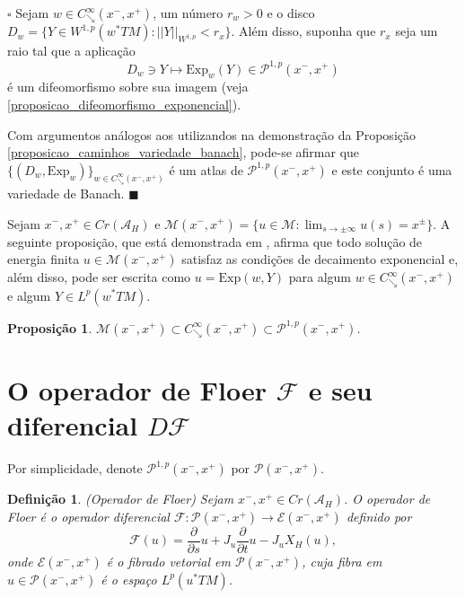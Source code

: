 \documentclass[12pt]{book}
\newtheorem{definicao}[teorema]{Definição}
\newtheorem{proposicao}[teorema]{Proposição}
\newenvironment{prova}[1]{$\square$ #1}{\hfill$\blacksquare$}
\newcommand{\caminhosdecaimentoexponencial}[2]{C^{\infty}_{\searrow}(#1, #2)}
\newcommand{\caminhosdecaimentoexponencialpadrao}{\caminhosdecaimentoexponencial{x^{-}}{x^{+}}}
\newcommand{\caminhosexponenciaisconectantesabrev}{\mathcal{P}(x^{-},x^{+})}
\newcommand{\caminhosexponenciaisconectantes}[2]{\mathcal{P}^{1,p}(#1, #2)}
\newcommand{\caminhosexponenciaisconectantespadrao}{\caminhosexponenciaisconectantes{x^{-}}{x^{+}}}
\newcommand{\diferencialfloer}{D\operadorFloer}
\newcommand{\derivadaparcial}[2]{\frac{\partial #1}{\partial #2}}
\newcommand{\energiafinitaM}{\mathcal{M}}
\newcommand{\energiafinitaMconectante}{\energiafinitaM(x^{-}, x^{+})}
\newcommand{\espacoLp}[1]{L^{p}(#1)}
\newcommand{\espacosobolev}[1]{W^{1,p}(#1)}
\newcommand{\Exp}{\text{Exp}}
\newcommand{\fibradocaminhosexponenciais}{\mathcal{E}(x^{-}, x^{+})}
\newcommand{\funcionalH}{\mathcal{A}_{H}}
\newcommand{\operadorFloer}{\mathcal{F}}
\newcommand{\operadorFloerDefinicao}[1]{\derivadaparcial{}{s}#1 + J_{#1}\derivadaparcial{}{t}#1 - J_{#1}X_{H}(#1)}
\newcommand{\operadorFloerParametro}[1]{\mathcal{F}(#1)}
\newcommand{\normaWp}[1]{||#1||_{W^{1,p}}}
\newcommand{\pontoscriticos}[1]{\textit{Cr}(#1)}
\newcommand{\pullbackfibradotangente}[2]{#1^{*}T#2}
\newcommand{\pullbackfibradotangenteM}[1]{\pullbackfibradotangente{#1}{M}}
\begin{document}
	\begin{prova}
		Sejam $w \in \caminhosdecaimentoexponencialpadrao$, um número $r_{w}>0$ e o disco $D_{w}=\{Y \in \espacosobolev{\pullbackfibradotangenteM{w}}: \normaWp{Y}<r_{x} \}$. Além disso, suponha que $r_{x}$ seja um raio tal que a aplicação 
		$$
		D_{w}\ni Y\mapsto \Exp_{w}(Y) \in \caminhosexponenciaisconectantespadrao
		$$ 
		é um difeomorfismo sobre sua imagem (veja \ref{proposicao_difeomorfismo_exponencial}). 
		
		Com argumentos análogos aos utilizandos na demonstração da Proposição \ref{proposicao_caminhos_variedade_banach}, pode-se afirmar que $\{(D_{w}, \Exp_{w})\}_{w\in \caminhosdecaimentoexponencialpadrao} $ é um atlas de $\caminhosexponenciaisconectantespadrao$ e este conjunto é uma variedade de Banach.
	\end{prova}
	
		Sejam $x^{-}, x^{+} \in \pontoscriticos{\funcionalH}$ e $\energiafinitaMconectante =\{u\in \energiafinitaM: \lim_{s\to \pm \infty}u(s) =x^{\pm}\}$.
		A seguinte proposição, que está demonstrada em \cite{audi_floer_homology}, afirma que todo solução de energia finita $u \in \energiafinitaMconectante$ satisfaz as condições de decaimento exponencial e, além disso, pode ser escrita como $u=\Exp(w,Y)$ para algum $w\in \caminhosdecaimentoexponencialpadrao$ e algum $Y\in \espacoLp{\pullbackfibradotangenteM{w}}$.
		
		\begin{proposicao}\label{proposicao_cadeia_caminhos_conectantes}
			$\energiafinitaMconectante \subset \caminhosdecaimentoexponencialpadrao \subset  \caminhosexponenciaisconectantespadrao$.
		\end{proposicao}
		
	
	\section{O operador de Floer $\operadorFloer$ e seu diferencial $\diferencialfloer$}\label{secao_operador_floer}
	
	Por simplicidade, denote $\caminhosexponenciaisconectantespadrao$ por $\caminhosexponenciaisconectantesabrev$.
	
	\begin{definicao}\label{definicao_operador_floer}
		(Operador de Floer) Sejam $x^{-}, x^{+}\in \pontoscriticos{\funcionalH}$. O operador de Floer é o operador diferencial $\operadorFloer: \caminhosexponenciaisconectantesabrev \to \fibradocaminhosexponenciais$ definido por
		$$
		\operadorFloerParametro{u} =\operadorFloerDefinicao{u},
		$$
		onde $\fibradocaminhosexponenciais$ é o fibrado vetorial em $\caminhosexponenciaisconectantesabrev$, cuja fibra em $u\in \caminhosexponenciaisconectantesabrev$ é o espaço $\espacoLp{\pullbackfibradotangenteM{u}	}$.
	\end{definicao}
	
\end{document}
